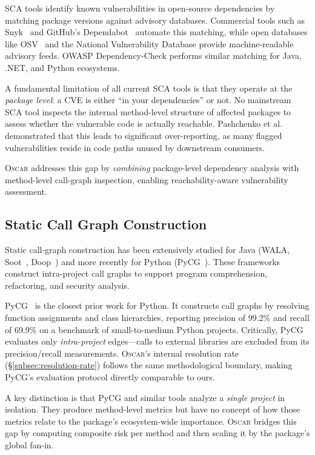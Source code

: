 \documentclass[conference]{IEEEtran}
\begin{document}
SCA tools identify known vulnerabilities in open-source dependencies by matching package versions against advisory databases. Commercial tools such as Snyk~\cite{snyk2024} and GitHub's Dependabot~\cite{dependabot} automate this matching, while open databases like OSV~\cite{osv} and the National Vulnerability Database provide machine-readable advisory feeds. OWASP Dependency-Check performs similar matching for Java, .NET, and Python ecosystems.

A fundamental limitation of all current SCA tools is that they operate at the \emph{package level}: a CVE is either ``in your dependencies'' or not. No mainstream SCA tool inspects the internal method-level structure of affected packages to assess whether the vulnerable code is actually reachable. Pashchenko et al.~\cite{pashchenko2020vuln4real} demonstrated that this leads to significant over-reporting, as many flagged vulnerabilities reside in code paths unused by downstream consumers.

\textsc{Oscar} addresses this gap by \emph{combining} package-level dependency analysis with method-level call-graph inspection, enabling reachability-aware vulnerability assessment.

\subsection{Static Call Graph Construction}

Static call-graph construction has been extensively studied for Java (WALA, Soot~\cite{lam2011soot}, Doop~\cite{smaragdakis2015doop}) and more recently for Python (PyCG~\cite{salis2021pycg}). These frameworks construct intra-project call graphs to support program comprehension, refactoring, and security analysis.

PyCG~\cite{salis2021pycg} is the closest prior work for Python. It constructs call graphs by resolving function assignments and class hierarchies, reporting precision of 99.2\% and recall of 69.9\% on a benchmark of small-to-medium Python projects. Critically, PyCG evaluates only \emph{intra-project} edges---calls to external libraries are excluded from its precision/recall measurements. \textsc{Oscar}'s internal resolution rate (§\ref{subsec:resolution-rate}) follows the same methodological boundary, making PyCG's evaluation protocol directly comparable to ours.

A key distinction is that PyCG and similar tools analyze a \emph{single project} in isolation. They produce method-level metrics but have no concept of how those metrics relate to the package's ecosystem-wide importance. \textsc{Oscar} bridges this gap by computing composite risk per method and then scaling it by the package's global fan-in.
\end{document}

